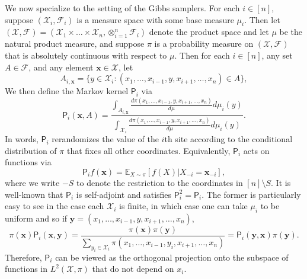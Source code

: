 \documentclass[11pt]{article}
\begin{document}
We now specialize to the setting of the Gibbs samplers. For each $i\in [n]$, suppose $(\mathcal{X}_i,\mathcal{F}_i)$ is a measure space with some base measure $\mu_i$. Then let $(\mathcal{X},\mathcal{F})=(\mathcal{X}_1\times\ldots\times \mathcal{X}_n,\otimes_{i=1}^n \mathcal{F}_i)$ denote the product space and let $\mu$ be the natural product measure, and suppose $\pi$ is a probability measure on $(\mathcal{X},\mathcal{F})$ that is absolutely continuous with respect to $\mu$. Then for each $i\in [n]$, any set $A\in \mathcal{F}$, and any element $\bm{x}\in \mathcal{X}$, let
\begin{equation*}
    A_{i,\bm{x}} = \{y\in \mathcal{X}_i: (x_1,\ldots,x_{i-1},y,x_{i+1},\ldots,x_n)\in A\},
\end{equation*}
We then define the Markov kernel $\mathsf{P}_i$ via
\begin{equation*}
    \mathsf{P}_i(\bm{x},A) = \frac{\int_{A_{i,\bm{x}}}\frac{d\pi(x_1,\ldots,x_{i-1},y,x_{i+1},\ldots,x_n)}{d\mu}d\mu_i(y)}{\int_{\mathcal{X}_i}\frac{d\pi(x_1,\ldots,x_{i-1},y,x_{i+1},\ldots,x_n)}{d\mu}d\mu_i(y)}.
\end{equation*}
In words, $\mathsf{P}_i$ rerandomizes the value of the $i$th site according to the conditional distribution of $\pi$ that fixes all other coordinates.
Equivalently, $\mathsf{P}_i$ acts on functions via
\begin{equation}
\label{eq:rerand}
    \mathsf{P}_if(\bm{x}) = \mathbb{E}_{X\sim \pi}[f(X)\vert X_{-i} = \bm{x}_{-i}],
\end{equation}
where we write $-S$ to denote the restriction to the coordinates in $[n]\setminus S$.
It is well-known that $\mathsf{P}_i$ is self-adjoint and satisfies $\mathsf{P}_i^2 = \mathsf{P}_i$. The former is particularly easy to see in the case each $\mathcal{X}_i$ is finite, in which case one can take $\mu_i$ to be uniform and so if $\bm{y}=(x_1,\ldots,x_{i-1},y,x_{i+1},\ldots,x_n)$,
\begin{equation*}
    \pi(\bm{x})\mathsf{P}_i(\bm{x},\bm{y})=\frac{\pi(\bm{x})\pi(\bm{y})}{\sum_{y_i\in \mathcal{X}_i} \pi(x_1,\ldots,x_{i-1},y_i,x_{i+1},\ldots,x_n)}=\mathsf{P}_i(\bm{y},\bm{x})\pi(\bm{y}).
\end{equation*} Therefore, $\mathsf{P}_i$ can be viewed as the orthogonal projection onto the subspace of functions in $L^2(\mathcal{X},\pi)$ that do not depend on $x_i$.
\end{document}
